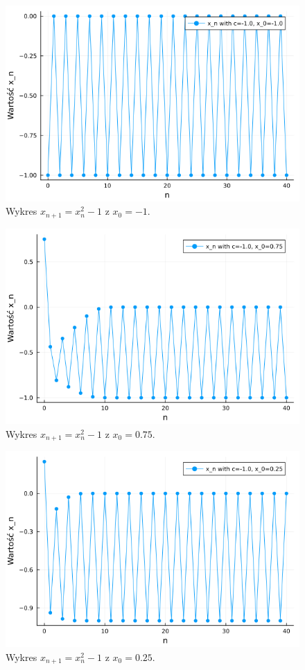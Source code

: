 \documentclass{article}
\begin{document}
\begin{figure}[H]
\centering
\includegraphics[width=\textwidth]{plot_2_2.png}
\caption{Wykres $x_{n + 1} = x_n^2 - 1$ z $x_0 = -1$.}
\end{figure}


\begin{figure}[H]
\centering
\includegraphics[width=\textwidth]{plot_2_3.png}
\caption{Wykres $x_{n + 1} = x_n^2 - 1$ z $x_0 = 0.75$.}
\end{figure}


\begin{figure}[H]
\centering
\includegraphics[width=\textwidth]{plot_2_4.png}
\caption{Wykres $x_{n + 1} = x_n^2 - 1$ z $x_0 = 0.25$.}
\end{figure}
\end{document}
